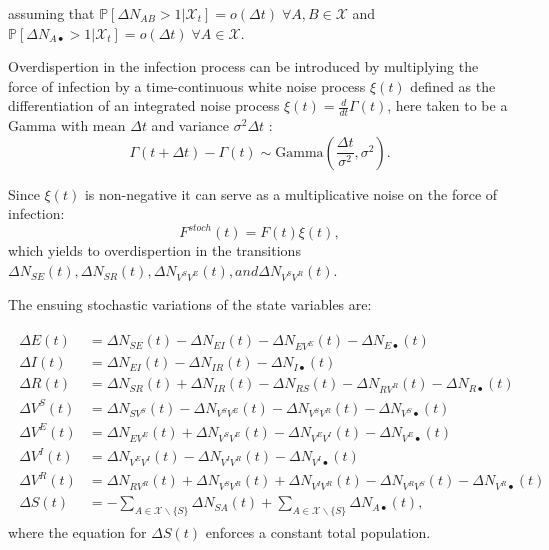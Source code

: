 assuming that \(\mathbb{P}[\Delta N_{AB} > 1|\mathcal{X}_t] = o(\Delta t) \; \forall A,B \in \mathcal{X}\) and \(\mathbb{P}[\Delta N_{A\bullet} > 1|\mathcal{X}_t] = o(\Delta t) \; \forall A \in \mathcal{X}\).

Overdispertion in the infection process can be introduced by multiplying
the force of infection by a time-continuous white noise process
\(\xi(t)\) defined as the differentiation of an integrated noise
process \(\xi(t) = \frac{d}{dt}\Gamma(t)\), here taken to be a Gamma
with mean \(\Delta t\) and variance \(\sigma^2 \Delta t\) \cite{Breto2011}: \[
\Gamma (t+\Delta t) - \Gamma (t) \sim \text{Gamma}\left( \frac{\Delta t}{\sigma^2}, \sigma^2\right).
\]

Since \(\xi(t)\) is non-negative it can serve as a multiplicative noise on
the force of infection: \[
F^{stoch}(t) = F(t) \xi(t),
\]
which yields to overdispertion in the transitions \(\Delta N_{SE}(t), \Delta N_{SR}(t), \Delta N_{V^SV^E}(t), and \Delta N_{V^SV^R}(t)\).

The ensuing stochastic variations of the state variables are:

\begin{gather}
\label{eq:stochstates}
\begin{aligned}
    \Delta E(t) &= \Delta N_{SE}(t) -  \Delta N_{EI}(t) - \Delta N_{EV^E}(t) -  \Delta N_{E\bullet}(t)\\
    \Delta I(t) &= \Delta N_{EI}(t) -  \Delta N_{IR}(t) -  \Delta N_{I\bullet}(t)\\
    \Delta R(t) &= \Delta N_{SR}(t) + \Delta N_{IR}(t) -  \Delta N_{RS}(t) -  \Delta N_{RV^R}(t) -  \Delta N_{R\bullet}(t)\\
    \Delta V^S(t) &= \Delta N_{SV^S}(t) -  \Delta N_{V^SV^E}(t) -\Delta N_{V^SV^R}(t) - \Delta N_{V^S\bullet}(t)\\
    \Delta V^E(t) &= \Delta N_{EV^E}(t) + \Delta N_{V^SV^E}(t) -  \Delta N_{V^EV^I}(t) - \Delta N_{V^E\bullet}(t)\\
    \Delta V^I(t) &= \Delta N_{V^EV^I}(t) -  \Delta N_{V^IV^R}(t) - \Delta N_{V^I\bullet}(t)\\
    \Delta V^R(t) &= \Delta N_{RV^R}(t) +  \Delta N_{V^SV^R}(t) +  \Delta N_{V^IV^R}(t) - \Delta N_{V^RV^S}(t) - \Delta N_{V^R\bullet}(t)\\
    \Delta S(t) &= - \sum_{A \in \mathcal{X} \backslash \{S\}} \Delta N_{SA}(t) + \sum_{A \in \mathcal{X} \backslash \{S\}} \Delta N_{A\bullet}(t), 
\end{aligned}
\end{gather}
where the equation for \(\Delta S(t)\) enforces a constant total population.

